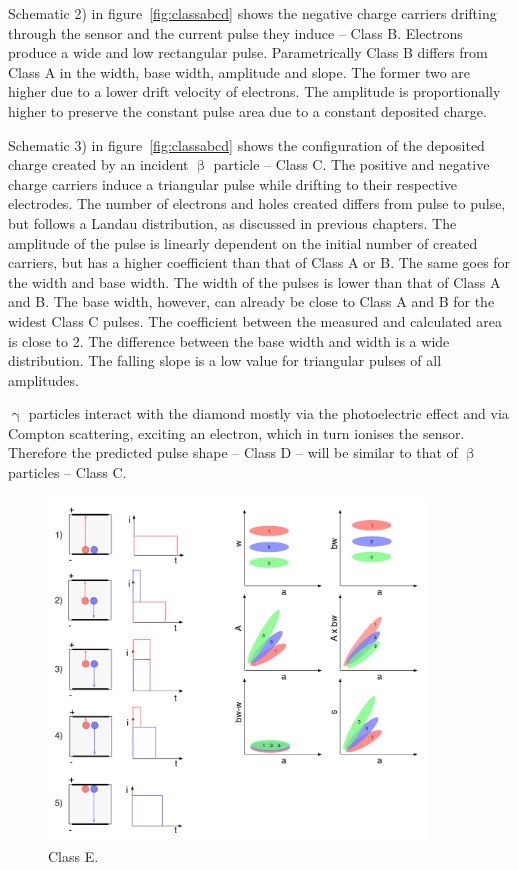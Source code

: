 Schematic 2) in figure~\ref{fig:classabcd} shows the negative charge carriers drifting through the sensor and the current pulse they induce -- Class B. Electrons produce a wide and low rectangular pulse. Parametrically Class B differs from Class A in the width, base width, amplitude and slope. The former two are higher due to a lower drift velocity of electrons. The amplitude is proportionally higher to preserve the constant pulse area due to a constant deposited charge.

Schematic 3) in figure~\ref{fig:classabcd} shows the configuration of the deposited charge created by an incident $\upbeta$ particle -- Class C. The positive and negative charge carriers induce a triangular pulse while drifting to their respective electrodes. The number of electrons and holes created differs from pulse to pulse, but follows a Landau distribution, as discussed in previous chapters. The amplitude of the pulse is linearly dependent on the initial number of created carriers, but has a higher coefficient than that of Class A or B. The same goes for the width and base width. The width of the pulses is lower than that of Class A and B. The base width, however, can already be close to Class A and B for the widest Class C pulses. The coefficient between the measured and calculated area is close to 2. The difference between the base width and width is a wide distribution. The falling slope is a low value for triangular pulses of all amplitudes.

$\upgamma$ particles interact with the diamond mostly via the photoelectric effect and via Compton scattering, exciting an electron, which in turn ionises the sensor. Therefore the predicted pulse shape -- Class D -- will be similar to that of $\upbeta$ particles -- Class C. 





\clearpage

\begin{figure}[!t]
\centering
\includegraphics[width=0.9\textwidth]{05_current_monitoring/plots/classE}
\caption{Class E.}
\label{fig:classe}
\end{figure}

